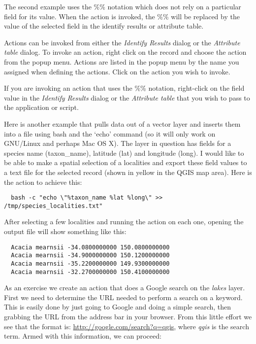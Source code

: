 The second example uses the \%\% notation which does not rely on a particular
field for its value. When the action is invoked, the \%\% will be replaced by
the value of the selected field in the identify results or attribute table.

\label{label_usingactions}

Actions can be invoked from either the \textit{Identify Results} dialog or the
\textit{Attribute table} dialog. To invoke an action, right click on the
record and choose the action from the popup menu. Actions are listed in the popup
menu by the name you assigned when defining the actions. Click on the action you
wish to invoke.

If you are invoking an action that uses the \%\% notation, right-click on the
field value in the \textit{Identify Results} dialog or the
\textit{Attribute table} that you wish to pass to the application or script.

Here is another example that pulls data out of a vector layer and inserts them
into a file using bash and the `echo' command (so it will only work on
GNU/Linux and perhaps Mac OS X). The layer in question has fields for a species name
(taxon\_name), latitude (lat) and longitude (long). I would like to be able to
make a spatial selection of a localities and export these field values to a
text file for the selected record (shown in yellow in the QGIS map area). Here is
the action to achieve this:

\begin{verbatim}
  bash -c "echo \"%taxon_name %lat %long\" >> /tmp/species_localities.txt"
\end{verbatim} 

After selecting a few localities and running the action on each one, opening
the output file will show something like this:

\begin{verbatim}
  Acacia mearnsii -34.0800000000 150.0800000000
  Acacia mearnsii -34.9000000000 150.1200000000
  Acacia mearnsii -35.2200000000 149.9300000000
  Acacia mearnsii -32.2700000000 150.4100000000
\end{verbatim} 

As an exercise we create an action that does a Google search on the 
\textsl{lakes} layer. First we need to determine the URL needed to perform a search on a
keyword. This is easily done by just going to Google and doing a simple
search, then grabbing the URL from the address bar in your browser. From this
little effort we see that the format is: \url{http://google.com/search?q=qgis},
where \textit{qgis} is the search term. Armed with this information, we can
proceed:

